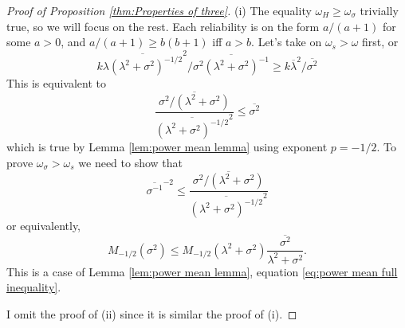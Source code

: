 \documentclass[twoside]{article}
\begin{document}
\begin{proof}[Proof of Proposition \ref{thm:Properties of three}]\label{proof:Properties}
(i) The equality $\omega_H \geq \omega_\sigma$ trivially true, so we will focus on the rest. Each reliability is on the form $a/(a+1)$ for some $a>0$, and $a/(a+1)\geq b(b+1)$
iff $a>b$. Let's take on $\omega_s > \omega$ first, or
\[
k\overline{\lambda(\lambda^{2}+\sigma^{2})^{-1/2}}^{2}/\overline{\sigma^{2}(\lambda^{2}+\sigma^{2})^{-1}}\geq k\overline{\lambda}^{2}/\overline{\sigma^{2}}
\]
This is equivalent to 
\[
\frac{\overline{\sigma^{2}/(\lambda^{2}+\sigma^{2})}}{\overline{(\lambda^{2}+\sigma^{2})^{-1/2}}^{2}}\leq\overline{\sigma^{2}}
\]
which is true by Lemma \ref{lem:power mean lemma} using exponent $p = -1/2$.
To prove $\omega_{\sigma}>\omega_{s}$ we need to show that
\[
\overline{\sigma^{-1}}^{-2}\leq\frac{\overline{\sigma^{2}/(\lambda^{2}+\sigma^{2})}}{\overline{(\lambda^{2}+\sigma^{2})^{-1/2}}^{2}}
\]
or equivalently,
\[
M_{-1/2}\left(\sigma^{2}\right)\leq M_{-1/2}\left(\lambda^{2}+\sigma^{2}\right)\overline{\frac{\sigma^{2}}{\lambda^{2}+\sigma^{2}}}.
\]
This is a case of Lemma \ref{lem:power mean lemma}, equation \eqref{eq:power mean full inequality}.

I omit the proof of (ii) since it is similar the proof of (i).
\end{proof}
\end{document}
